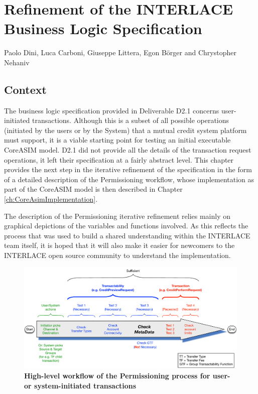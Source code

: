 \chapter{Refinement of the INTERLACE Business Logic Specification}
\label{ch:UpdateBLS}

\vspace{-1cm}
\begin{center}
Paolo Dini, Luca Carboni, Giuseppe Littera, Egon B\"orger and Chrystopher Nehaniv
\end{center}

\section{Context}
The business logic specification provided in Deliverable D2.1 \cite{INTERLACE_D21} concerns user-initiated transactions. Although this is a subset of all possible operations (initiated by the users or by the System) that a mutual credit system platform must support, it is a viable starting point for testing an initial executable CoreASIM model. D2.1 did not provide all the details of the transaction request operations, it left their specification at a fairly abstract level. This chapter provides the next step in the iterative refinement of the specification in the form of a detailed description of the Permissioning workflow, whose implementation as part of the CoreASIM model is then described in Chapter \ref{ch:CoreAsimImplementation}.

The description of the Permissioning iterative refinement relies mainly on graphical depictions of the variables and functions involved. As this reflects the process that was used to build a shared understanding within the INTERLACE team itself, it is hoped that it will also make it easier for newcomers to the INTERLACE open source community to understand the implementation.

\begin{figure}[htbp]
\centering
\includegraphics[width=16cm]{Figures/Transactability_Workflow}
\caption{\small\textbf{High-level workflow of the Permissioning process for user- or system-initiated transactions}}
\label{fig:transactabilitywkflow}
\end{figure}

